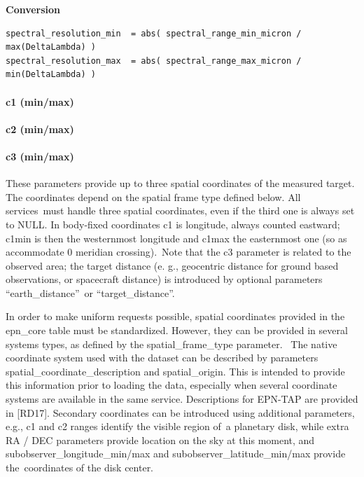 \documentclass[11pt,a4paper]{ivoa}
\begin{document}
\textbf{Conversion}




\begin{verbatim}
spectral_resolution_min  = abs( spectral_range_min_micron / max(DeltaLambda) )
spectral_resolution_max  = abs( spectral_range_max_micron / min(DeltaLambda) )
\end{verbatim}




\paragraph{c1 (min/max)}

\paragraph{c2 (min/max)}

\paragraph{c3 (min/max)}

These parameters provide up to three spatial coordinates of the measured target. The coordinates depend on the spatial frame type defined below. All services must handle three spatial coordinates, even if the third one is always set to NULL. In body-fixed coordinates c1 is longitude, always counted eastward; c1min is then the westernmost longitude and c1max the easternmost one (so as accommodate 0 meridian crossing). Note that the c3 parameter is related to the observed area; the target distance (e. g., geocentric distance for ground based observations, or spacecraft distance) is introduced by optional parameters  ``earth\_distance'' or ``target\_distance''.

In order to make uniform requests possible, spatial coordinates provided in the epn\_core table must be standardized. However, they can be provided in several systems types, as defined by the spatial\_frame\_type parameter.  The native coordinate system used with the dataset can be described by parameters spatial\_coordinate\_description and spatial\_origin. This is intended to provide this information prior to loading the data, especially when several coordinate systems are available in the same service. Descriptions for EPN-TAP are provided in [RD17]. Secondary coordinates can be introduced using additional parameters, e.g., c1 and c2 ranges identify the visible region of a planetary disk, while extra RA / DEC parameters provide location on the sky at this moment, and subobserver\_longitude\_min/max and subobserver\_latitude\_min/max provide the coordinates of the disk center.
\end{document}
